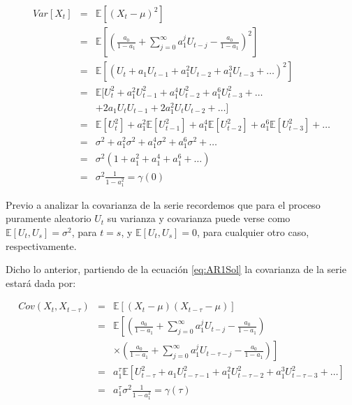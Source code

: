 \documentclass[
]{book}
\begin{document}
\begin{eqnarray}
Var[X_t] & = & \mathbb{E}[(X_t - \mu)^2] \nonumber \\
    & = & \mathbb{E} \left[ \left( \frac{a_0}{1 - a_1} + \sum^{\infty}_{j = 0} a_1^j U_{t-j} - \frac{a_0}{1 - a_1} \right)^2 \right] \nonumber \\
    & = & \mathbb{E}[(U_{t} + a_1 U_{t-1} + a_1^2 U_{t-2} + a_1^3 U_{t-3} + \ldots)^2] \nonumber \\
    & = & \mathbb{E}[U^2_{t} + a_1^2 U^2_{t-1} + a_1^4 U^2_{t-2} + a_1^6 U^2_{t-3} + \ldots \nonumber \\
    &   & + 2 a_1 U_t U_{t-1} + 2 a_1^2 U_t U_{t-2} + \ldots] \nonumber \\
    & = & \mathbb{E}[U^2_{t}] + a_1^2 \mathbb{E}[U^2_{t-1}] + a_1^4 \mathbb{E}[U^2_{t-2}] + a_1^6 \mathbb{E}[U^2_{t-3}] + \ldots \nonumber \\
    & = & \sigma^2 + a_1^2 \sigma^2 + a_1^4 \sigma^2 + a_1^6 \sigma^2 + \ldots \nonumber \\
    & = & \sigma^2 (1 + a_1^2 + a_1^4 + a_1^6 + \ldots) \nonumber \\
    & = & \sigma^2 \frac{1}{1 - a_1^2} = \gamma(0)
    \label{eq:AR1Var}
\end{eqnarray}

Previo a analizar la covarianza de la serie recordemos que para el
proceso puramente aleatorio \(U_t\) su varianza y covarianza puede verse
como \(\mathbb{E}[U_t, U_s] = \sigma^2\), para \(t = s\), y
\(\mathbb{E}[U_t, U_s] = 0\), para cualquier otro caso, respectivamente.

Dicho lo anterior, partiendo de la ecuación \eqref{eq:AR1Sol} la
covarianza de la serie estará dada por:

\begin{eqnarray}
Cov(X_t, X_{t-\tau}) & = & \mathbb{E}[(X_t - \mu)(X_{t-\tau} - \mu)] \nonumber \\
    & = & \mathbb{E} \left[ \left( \frac{a_0}{1 - a_1} + \sum^{\infty}_{j = 0} a_1^j U_{t-j} - \frac{a_0}{1 - a_1} \right) \right. \nonumber \\
    &   & \left. \times \left( \frac{a_0}{1 - a_1} + \sum^{\infty}_{j = 0} a_1^j U_{t-\tau-j} - \frac{a_0}{1 - a_1} \right) \right] \nonumber \\
    & = & a_1^{\tau} \mathbb{E}[U^2_{t-\tau} + a_1 U^2_{t-\tau-1} + a_1^2 U^2_{t-\tau-2} + a_1^3 U^2_{t-\tau-3} + \ldots] \nonumber \\
    & = & a_1^{\tau} \sigma^2 \frac{1}{1 - a_1^2} = \gamma(\tau)
    \label{eq:AR1Cov}
\end{eqnarray}
\end{document}

